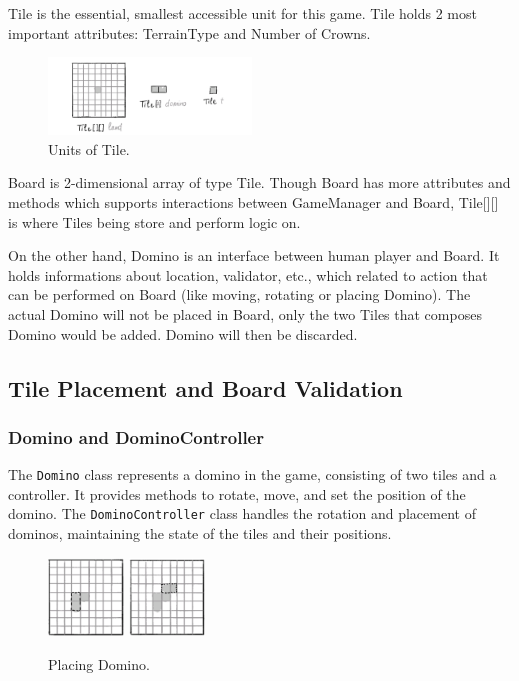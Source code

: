 \documentclass[conference]{IEEEtran}
\begin{document}
Tile is the essential, smallest accessible unit for this game. Tile holds 2
most important attributes: TerrainType and Number of Crowns.

\begin{figure}[htbp]
    \centerline{\includegraphics[width=0.48\textwidth]{assets/unit.png}}
    \caption{Units of Tile.}\label{fig:unit}
\end{figure}

Board is 2-dimensional array of type Tile. Though Board has more attributes and
methods which supports interactions between GameManager and Board, Tile[][] is
where Tiles being store and perform logic on.

On the other hand, Domino is an interface between human player and Board. It
holds informations about location, validator, etc., which related to action
that can be performed on Board (like moving, rotating or placing Domino). The
actual Domino will not be placed in Board, only the two Tiles that composes
Domino would be added. Domino will then be discarded.

\subsection{Tile Placement and Board Validation}

\subsubsection{Domino and DominoController}

The \texttt{Domino} class represents a domino in the game, consisting of two
tiles and a controller. It provides methods to rotate, move, and set the
position of the domino. The \texttt{DominoController} class handles the
rotation and placement of dominos, maintaining the state of the tiles and their
positions.

\begin{figure}[htbp]
    \centerline{
        \includegraphics[width=0.18\textwidth]{assets/placing-1.png}
        \hspace{0.01\textwidth}
        \includegraphics[width=0.18\textwidth]{assets/placing-2.png}
    }
    \caption{Placing Domino.}\label{fig:placing}
\end{figure}
\end{document}
